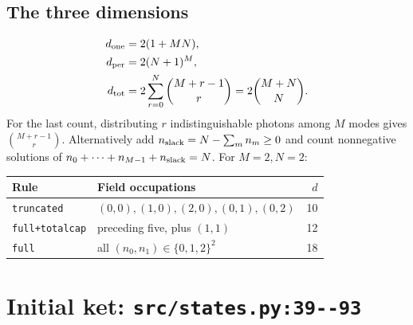 \documentclass[11pt,a4paper]{article}
\newcommand{\code}[1]{\nolinkurl{#1}}
\begin{document}
\subsection{The three dimensions}
\begin{align}
d_{\rm one}&=2(1+MN),\\
d_{\rm per}&=2(N+1)^M,\\
d_{\rm tot}&=2\sum_{r=0}^{N}\binom{M+r-1}{r}
             =2\binom{M+N}{N}.
\end{align}
For the last count, distributing $r$ indistinguishable photons among $M$ modes
gives $\binom{M+r-1}{r}$. Alternatively add
$n_{\rm slack}=N-\sum_mn_m\geq0$ and count nonnegative solutions of
$n_0+\cdots+n_{M-1}+n_{\rm slack}=N$.
For $M=2,N=2$:
\begin{center}\small
\begin{tabular}{p{}p{}r}
\toprule Rule & Field occupations & $d$\\\midrule
\code{truncated} & $(0,0),(1,0),(2,0),(0,1),(0,2)$ & 10\\
\code{full+totalcap} & preceding five, plus $(1,1)$ & 12\\
\code{full} & all $(n_0,n_1)\in\{0,1,2\}^2$ & 18\\
\bottomrule
\end{tabular}
\end{center}
\section{Initial ket: \code{src/states.py:39--93}}
\end{document}

